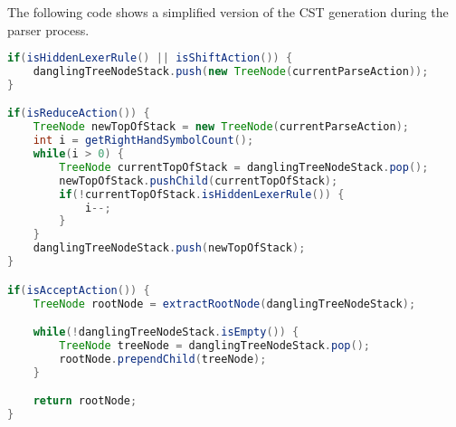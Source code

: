 The following code shows a simplified version of the CST generation during the parser process.
\begin{lstlisting}[language=Java, caption=CST Generation]
if(isHiddenLexerRule() || isShiftAction()) {
    danglingTreeNodeStack.push(new TreeNode(currentParseAction));
} 

if(isReduceAction()) {
    TreeNode newTopOfStack = new TreeNode(currentParseAction);
    int i = getRightHandSymbolCount();
    while(i > 0) {
        TreeNode currentTopOfStack = danglingTreeNodeStack.pop();
        newTopOfStack.pushChild(currentTopOfStack);
        if(!currentTopOfStack.isHiddenLexerRule()) {
            i--;
        }
    }
    danglingTreeNodeStack.push(newTopOfStack);
}

if(isAcceptAction()) {
    TreeNode rootNode = extractRootNode(danglingTreeNodeStack);

    while(!danglingTreeNodeStack.isEmpty()) {
        TreeNode treeNode = danglingTreeNodeStack.pop();
        rootNode.prependChild(treeNode);
    }

    return rootNode;
}
\end{lstlisting}

